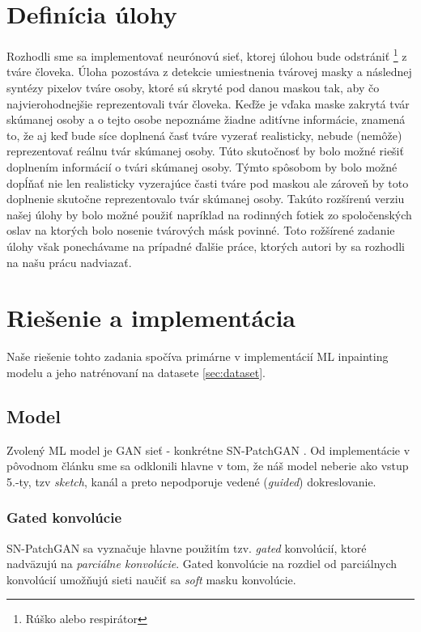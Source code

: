 \documentclass [11pt, a4paper]{article}
\begin{document}
	\section{Definícia úlohy}
	Rozhodli sme sa implementovať neurónovú sieť, ktorej úlohou bude odstrániť \footnote{Rúško alebo respirátor} z tváre človeka. Úloha pozostáva z detekcie umiestnenia tvárovej masky a 	následnej syntézy pixelov tváre osoby, ktoré sú skryté pod danou maskou tak, aby čo najvierohodnejšie reprezentovali tvár človeka. Keďže je vďaka maske zakrytá tvár skúmanej osoby a o tejto osobe nepoznáme žiadne aditívne informácie, znamená to, že aj keď bude síce doplnená časť tváre vyzerať realisticky, nebude (nemôže) reprezentovať reálnu tvár skúmanej osoby. Túto skutočnosť by bolo možné riešiť doplnením informácií o tvári skúmanej osoby. Týmto spôsobom by bolo možné dopĺňať nie len realisticky vyzerajúce časti tváre pod maskou ale zároveň by toto doplnenie skutočne reprezentovalo tvár skúmanej osoby. Takúto rozšírenú verziu našej úlohy by bolo možné použiť napríklad na  rodinných fotiek zo spoločenských oslav na ktorých bolo nosenie tvárových másk povinné. Toto rožšírené zadanie úlohy však ponechávame na prípadné ďalšie práce, ktorých autori by sa rozhodli na našu prácu nadviazať.
	
	\section{Riešenie a implementácia}
	Naše riešenie tohto zadania spočíva primárne v implementácií ML inpainting modelu a jeho natrénovaní na datasete \ref{sec:dataset}.
	
	\subsection{Model}
	Zvolený ML model je GAN sieť - konkrétne SN-PatchGAN \cite{yu2018free}. Od implementácie v pôvodnom článku sme sa odklonili hlavne v tom, že náš model neberie ako vstup 5.-ty, tzv \textit{sketch}, kanál a preto nepodporuje vedené (\textit{guided}) dokreslovanie.
	
	\subsubsection{Gated konvolúcie}\label{sec:gated_conv}
	SN-PatchGAN sa vyznačuje hlavne použitím tzv. \textit{gated} konvolúcií, ktoré nadväzujú na \textit{parciálne konvolúcie}\cite{liu2018image}. Gated konvolúcie na rozdiel od parciálnych konvolúcií umožňujú sieti naučiť sa \textit{soft} masku konvolúcie.
	
\end{document}
